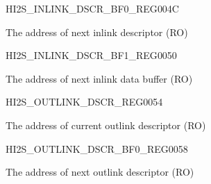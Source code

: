 \begin{register}{H}{I2S\_INLINK\_DSCR\_BF0\_REG}{\hexprefix{}004C}\label{regdesc:I2SINLINKDSCRBF0REG}
%
\regnewline%
\begin{regdesc}\begin{reglist}
\label{fielddesc:I2SINLINKDSCRBF0}\item [I2S\_INLINK\_DSCR\_BF0] The address of next inlink descriptor (RO)
\end{reglist}\end{regdesc}
\end{register}


\begin{register}{H}{I2S\_INLINK\_DSCR\_BF1\_REG}{\hexprefix{}0050}\label{regdesc:I2SINLINKDSCRBF1REG}
%
\regnewline%
\begin{regdesc}\begin{reglist}
\label{fielddesc:I2SINLINKDSCRBF1}\item [I2S\_INLINK\_DSCR\_BF1] The address of next inlink data buffer (RO)
\end{reglist}\end{regdesc}
\end{register}


\begin{register}{H}{I2S\_OUTLINK\_DSCR\_REG}{\hexprefix{}0054}\label{regdesc:I2SOUTLINKDSCRREG}
%
\regnewline%
\begin{regdesc}\begin{reglist}
\label{fielddesc:I2SOUTLINKDSCR}\item [I2S\_OUTLINK\_DSCR] The address of current outlink descriptor (RO)
\end{reglist}\end{regdesc}
\end{register}


\begin{register}{H}{I2S\_OUTLINK\_DSCR\_BF0\_REG}{\hexprefix{}0058}\label{regdesc:I2SOUTLINKDSCRBF0REG}
%
\regnewline%
\begin{regdesc}\begin{reglist}
\label{fielddesc:I2SOUTLINKDSCRBF0}\item [I2S\_OUTLINK\_DSCR\_BF0] The address of next outlink descriptor (RO)
\end{reglist}\end{regdesc}
\end{register}


